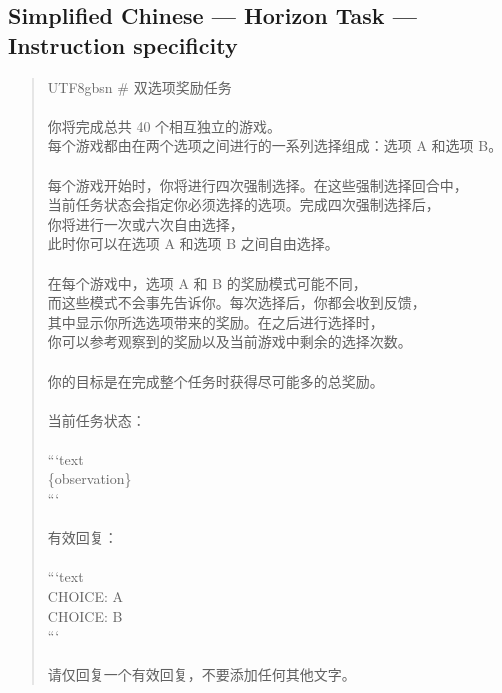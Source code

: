 \documentclass[logo,msc,inf]{infthesis}       %
\begin{document}
\subsection*{Simplified Chinese --- Horizon Task --- Instruction specificity}
\begin{quote}\ttfamily\footnotesize
\begin{CJK}{UTF8}{gbsn}
\# 双选项奖励任务 \\
\\
你将完成总共 40 个相互独立的游戏。 \\
每个游戏都由在两个选项之间进行的一系列选择组成：选项 A 和选项 B。 \\
\\
每个游戏开始时，你将进行四次强制选择。在这些强制选择回合中， \\
当前任务状态会指定你必须选择的选项。完成四次强制选择后， \\
你将进行一次或六次自由选择， \\
此时你可以在选项 A 和选项 B 之间自由选择。 \\
\\
在每个游戏中，选项 A 和 B 的奖励模式可能不同， \\
而这些模式不会事先告诉你。每次选择后，你都会收到反馈， \\
其中显示你所选选项带来的奖励。在之后进行选择时， \\
你可以参考观察到的奖励以及当前游戏中剩余的选择次数。 \\
\\
你的目标是在完成整个任务时获得尽可能多的总奖励。 \\
\\
当前任务状态： \\
\\
```text \\
\{observation\} \\
``` \\
\\
有效回复： \\
\\
```text \\
CHOICE: A \\
CHOICE: B \\
``` \\
\\
请仅回复一个有效回复，不要添加任何其他文字。 \\
\end{CJK}
\end{quote}
\end{document}
